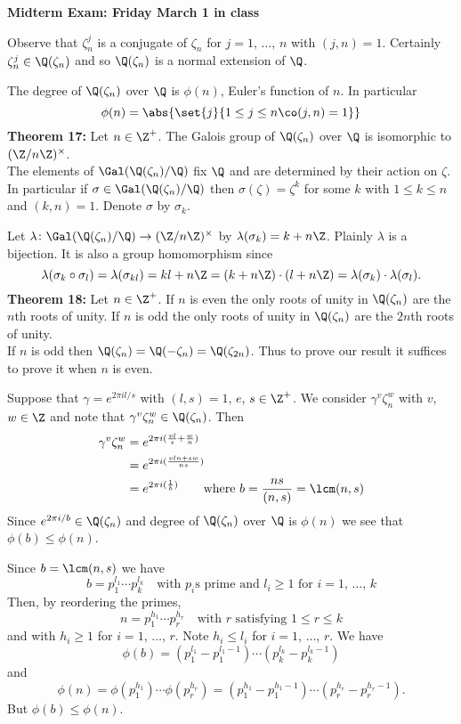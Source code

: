 \textbf{Midterm Exam: Friday March 1 in class}

Observe that $\zeta_n^j$ is a conjugate of $\zeta_n$ for $j=1$, $\dotsc$, $n$ with $(j,n)=1$.  Certainly $\zeta_n^j\in\Q(\zeta_n)$ and so $\Q(\zeta_n)$ is a normal extension of $\Q$.

The degree of $\Q(\zeta_n)$ over $\Q$ is $\phi(n)$, Euler's function of $n$.  In particular
\[ \phi(n) = \abs{\set{j}{1\leq j\leq n\co(j,n)=1}} \]
\textbf{Theorem 17:} Let $n\in\Z^+$.  The Galois group of $\Q(\zeta_n)$ over $\Q$ is isomorphic to $(\Z/n\Z)^\times$. \\
\pf The elements of $\Gal(\Q(\zeta_n)/\Q)$ fix $\Q$ and are determined by their action on $\zeta$.  In particular if $\sigma\in\Gal(\Q(\zeta_n)/\Q)$ then $\sigma(\zeta)=\zeta^k$ for some $k$ with $1\leq k\leq n$ and $(k,n)=1$.  Denote $\sigma$ by $\sigma_k$.

Let $\lambda\colon\Gal(\Q(\zeta_n)/\Q)\to(\Z/n\Z)^\times$ by $\lambda(\sigma_k)=k+n\Z$.  Plainly $\lambda$ is a bijection.  It is also a group homomorphism since
\[ \lambda(\sigma_k\circ\sigma_l) = \lambda(\sigma_{kl}) = kl + n\Z = (k+n\Z)\cdot(l+n\Z) = \lambda(\sigma_k)\cdot\lambda(\sigma_l) . \]
\textbf{Theorem 18:} Let $n\in\Z^+$.  If $n$ is even the only roots of unity in $\Q(\zeta_n)$ are the $n$th roots of unity.  If $n$ is odd the only roots of unity in $\Q(\zeta_n)$ are the $2n$th roots of unity. \\
\pf If $n$ is odd then $\Q(\zeta_n)=\Q(-\zeta_n)=\Q(\zeta_{2n})$.  Thus to prove our result it suffices to prove it when $n$ is even.

Suppose that $\gamma=e^{2\pi il/s}$ with $(l,s)=1$, $e$, $s\in\Z^+$.  We consider $\gamma^v\zeta_n^w$ with $v$, $w\in\Z$ and note that $\gamma^v\zeta_n^w\in\Q(\zeta_n)$.  Then
\begin{align*}
\gamma^v\zeta_n^w &= e^{2\pi i(\frac{vl}{s}+\frac{w}{n})} \\
&= e^{2\pi i(\frac{vln+sw}{ns})} \\
&= e^{2\pi i(\frac{1}{b})} \qquad\text{where $b=\frac{ns}{(n,s)}=\lcm(n,s)$}
\end{align*}
Since $e^{2\pi i/b}\in\Q(\zeta_n)$ and degree of $\Q(\zeta_n)$ over $\Q$ is $\phi(n)$ we see that $\phi(b)\leq\phi(n)$.

Since $b=\lcm(n,s)$ we have
\[ b = p_1^{l_1}\dotsm p_k^{l_k} \quad\text{with $p_i$s prime and $l_i\geq1$ for $i=1$, $\dotsc$, $k$} \]
Then, by reordering the primes,
\[ n = p_1^{h_1}\dotsm p_r^{h_r} \quad\text{with $r$ satisfying $1\leq r\leq k$} \]
and with $h_i\geq1$ for $i=1$, $\dotsc$, $r$.  Note $h_i\leq l_i$ for $i=1$, $\dotsc$, $r$.  We have
\[ \phi(b) = (p_1^{l_1}-p_1^{l_1-1})\dotsm(p_k^{l_k}-p_k^{l_k-1}) \]
and
\[ \phi(n) = \phi(p_1^{h_1})\dotsm\phi(p_r^{h_r}) = (p_1^{h_1}-p_1^{h_1-1})\dotsm(p_r^{h_r}-p_r^{h_r-1}) . \]
But $\phi(b)\leq\phi(n)$.


